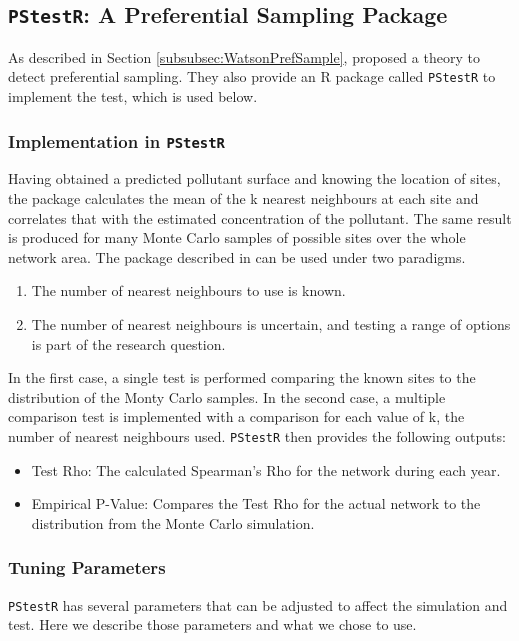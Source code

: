 \subsection{\texttt{PStestR}: A Preferential Sampling Package}
\label{subsec:prefsamppkg}

As described in Section \ref{subsubsec:WatsonPrefSample}, \citet{watson2020} proposed a theory to detect preferential sampling.  They also provide an R package called \texttt{PStestR} to implement the test, which is used below.

\subsubsection*{Implementation in \texttt{PStestR}}
\label{subsubsec:implementation}
Having obtained a predicted pollutant surface and knowing the location of sites, the package calculates the mean of the \gls{k} nearest neighbours at each site and correlates that with the estimated concentration of the pollutant. The same result is produced for many Monte Carlo samples of possible sites over the whole network area.
The package described in \cite{watson2020} can be used under two paradigms. 
\begin{enumerate}
	\item The number of nearest neighbours to use is known.
	\item The number of nearest neighbours is uncertain, and testing a range of options is part of the research question.
\end{enumerate}
In the first case, a single test is performed comparing the known sites to the distribution of the Monty Carlo samples.  In the second case, a multiple comparison test is implemented with a comparison for each value of \gls{k}, the number of nearest neighbours used.  \texttt{PStestR} then provides the following outputs:
\begin{itemize}
	\item Test Rho:  The calculated Spearman's Rho for the network during each year.
	\item Empirical P-Value:  Compares the Test Rho for the actual network to the distribution from the Monte Carlo simulation.
\end{itemize}

\subsubsection*{Tuning Parameters}
\label{subsubsec:tuneparameters}
\texttt{PStestR} has several parameters that can be adjusted to affect the simulation and test.  Here we describe those parameters and what we chose to use.


